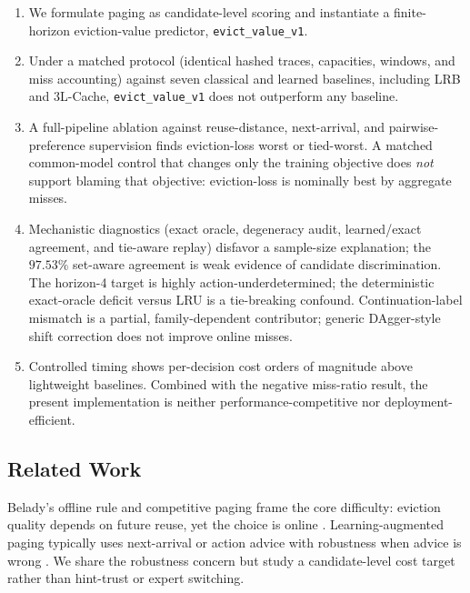 \documentclass[preprint,12pt]{elsarticle}
\begin{document}
\begin{enumerate}
    \item We formulate paging as candidate-level scoring and instantiate a finite-horizon eviction-value predictor, \texttt{evict\_value\_v1}.
    \item Under a matched protocol (identical hashed traces, capacities, windows, and miss accounting) against seven classical and learned baselines, including LRB and 3L-Cache, \texttt{evict\_value\_v1} does not outperform any baseline.
    \item A full-pipeline ablation against reuse-distance, next-arrival, and pairwise-preference supervision finds eviction-loss worst or tied-worst. A matched common-model control that changes only the training objective does \emph{not} support blaming that objective: eviction-loss is nominally best by aggregate misses.
    \item Mechanistic diagnostics (exact oracle, degeneracy audit, learned/exact agreement, and tie-aware replay) disfavor a sample-size explanation; the $97.53\%$ set-aware agreement is weak evidence of candidate discrimination. The horizon-4 target is highly action-underdetermined; the deterministic exact-oracle deficit versus LRU is a tie-breaking confound. Continuation-label mismatch is a partial, family-dependent contributor; generic DAgger-style shift correction does not improve online misses.
    \item Controlled timing shows per-decision cost orders of magnitude above lightweight baselines. Combined with the negative miss-ratio result, the present implementation is neither performance-competitive nor deployment-efficient.
\end{enumerate}

\subsection{Related Work}
\label{subsec:related_work}

Belady's offline rule and competitive paging frame the core difficulty: eviction quality depends on future reuse, yet the choice is online \cite{belady1966replacement_algorithms,fiat1991competitive_paging}. Learning-augmented paging typically uses next-arrival or action advice with robustness when advice is wrong \cite{lykouris2021competitive_caching,rohatgi2020near_optimal_caching,bansal2022learning_augmented_weighted_paging,im2022parsimonious_lac,antoniadis2020online_metric_untrusted,wei2020better_simpler_lac,chledowski2021robust_lac_experimental,blum2000online_learning_mts}. We share the robustness concern but study a candidate-level cost target rather than hint-trust or expert switching.
\end{document}
